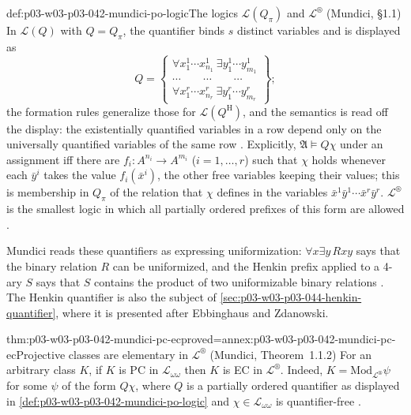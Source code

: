 \begin{hbdefinition}{def:p03-w03-p03-042-mundici-po-logic}{The logics \(\mathscr L(Q_\pi)\) and \(\mathscr L^{\circledR}\) (Mundici, \S1.1)}
In \(\mathscr L(Q)\) with \(Q=Q_\pi\), the quantifier binds \(s\) distinct
variables and is displayed as
\[
 Q=\begin{Bmatrix}\forall x^1_1\cdots x^1_{n_1}\ \exists y^1_1\cdots
 y^1_{m_1}\\ \cdots\qquad\cdots\qquad\cdots\\ \forall x^r_1\cdots
 x^r_{n_r}\ \exists y^r_1\cdots y^r_{m_r}\end{Bmatrix};
\]
the formation rules generalize those for \(\mathscr L(Q^{\mathrm H})\), and
the semantics is read off the display: the existentially quantified
variables in a row depend only on the universally quantified variables of
the same row \cite[p.~213]{Mundici1985OtherQuantifiers}.  Explicitly,
\(\mathfrak A\models Q\chi\) under an assignment iff there are
\(f_i:A^{n_i}\to A^{m_i}\) (\(i=1,\ldots,r\)) such that \(\chi\) holds
whenever each \(\bar y^i\) takes the value \(f_i(\bar x^i)\), the other
free variables keeping their values; this is membership in \(Q_\pi\) of
the relation that \(\chi\) defines in the variables \(\bar x^1\bar
y^1\cdots\bar x^r\bar y^r\).  \(\mathscr L^{\circledR}\) is the smallest
logic in which all partially ordered prefixes of this form are allowed
\cite[p.~213]{Mundici1985OtherQuantifiers}.
\end{hbdefinition}

Mundici reads these quantifiers as expressing uniformization: \(\forall x
\exists y\,Rxy\) says that the binary relation \(R\) can be uniformized,
and the Henkin prefix applied to a 4-ary \(S\) says that \(S\) contains the
product of two uniformizable binary relations
\cite[pp.~212--213]{Mundici1985OtherQuantifiers}.  The Henkin quantifier is
also the subject of \cref{sec:p03-w03-p03-044-henkin-quantifier}, where it
is presented after Ebbinghaus and Zdanowski.

\begin{hbtheorem}{thm:p03-w03-p03-042-mundici-pc-ec}{proved=annex:p03-w03-p03-042-mundici-pc-ec}{Projective classes are elementary in \(\mathscr L^{\circledR}\) (Mundici, Theorem~1.1.2)}
For an arbitrary class \(K\), if \(K\) is PC in \(\mathscr L_{\omega\omega}\)
then \(K\) is EC in \(\mathscr L^{\circledR}\).  Indeed,
\(K=\mathrm{Mod}_{\mathscr L^{\circledR}}\psi\) for some \(\psi\) of the
form \(Q\chi\), where \(Q\) is a partially ordered quantifier as displayed
in \cref{def:p03-w03-p03-042-mundici-po-logic} and \(\chi\in\mathscr
L_{\omega\omega}\) is quantifier-free
\cite[p.~213]{Mundici1985OtherQuantifiers}.
\end{hbtheorem}

